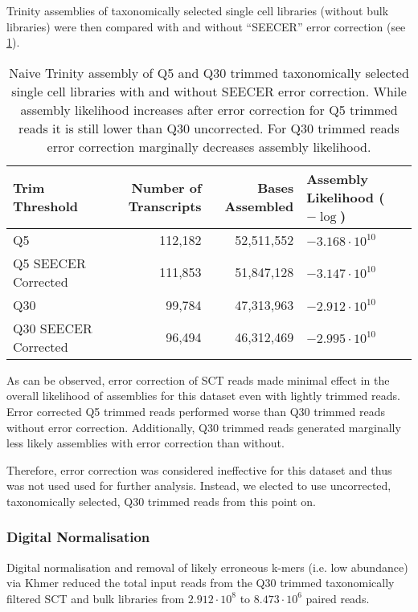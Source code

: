Trinity assemblies of taxonomically selected single cell libraries 
(without bulk libraries) were then compared with and without ``SEECER'' 
error correction (see \cref{tab:errcorr_assembly}).
\begin{table}[h]
     \begin{tabularx}{\textwidth}{|l||r|r|l|@{}}
     	\hline 
         \textbf{Trim Threshold} & \textbf{Number of Transcripts} & \textbf{Bases Assembled} & \textbf{Assembly Likelihood (\(-\log\))} \\
         \hline 
         Q5 &  112,182 & 52,511,552 & \(-3.168 \cdot 10^{10}\) \\
         Q5 SEECER Corrected & 111,853 &  51,847,128 & \(-3.147\cdot 10^{10}\) \\
         Q30 & 99,784 & 47,313,963 & \(-2.912\cdot 10^{10}\)  \\ 
         Q30 SEECER Corrected & 96,494 & 46,312,469 & \(-2.995\cdot 10^{10}\)  \\ 
    \hline
    \end{tabularx}
    \caption{Naive Trinity assembly of Q5 and Q30 trimmed taxonomically selected single cell libraries
        with and without SEECER error correction. While assembly likelihood increases after
    error correction for Q5 trimmed reads it is still lower than Q30 uncorrected.  For Q30
trimmed reads error correction marginally decreases assembly likelihood.}
    \label{tab:errcorr_assembly}
\end{table}

As can be observed, error correction of SCT reads made minimal effect in the overall likelihood
of assemblies for this dataset even with lightly trimmed reads.  Error corrected Q5
trimmed reads performed worse than Q30 trimmed reads without error correction. 
Additionally, Q30 trimmed reads generated marginally less likely assemblies with 
error correction than without. 

Therefore, error correction
was considered ineffective for this dataset and thus was not used 
used for further analysis.  Instead, we elected to use uncorrected, taxonomically selected,
Q30 trimmed reads from this point on. 

\subsubsection{Digital Normalisation} 
Digital normalisation and removal of likely erroneous k-mers (i.e. low abundance) 
via Khmer reduced the total input reads from the Q30 trimmed taxonomically
filtered SCT and bulk libraries from 
\(2.912\cdot 10^{8}\) to \(8.473\cdot 10^6\) paired reads.

